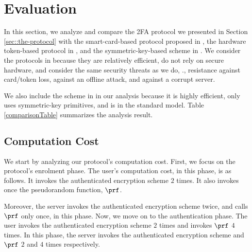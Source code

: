 
\section{Evaluation}\label{app:long-eval}



In this section, we analyze and compare the 2FA protocol we presented in Section \ref{sec::the-protocol} with the smart-card-based protocol proposed in  \cite{WangW18}, the hardware token-based protocol in \cite{JareckiJKSS21}, and the symmetric-key-based scheme in  \cite{MatsuoMY11}.  We consider the protocols in  \cite{WangW18,JareckiJKSS21} because they are relatively efficient, do not rely on secure hardware, and consider the same security threats as we do, \ie., resistance against card/token loss, against an offline attack, and against a corrupt server. 

We also include the scheme in  \cite{MatsuoMY11}  in our analysis because it is highly efficient, only uses symmetric-key primitives, and is in the standard model. Table \ref{comparisonTable} summarizes the analysis result.

%







\subsection{Computation Cost}

We start by analyzing our protocol's computation cost. First, we focus on the protocol's enrolment phase. The user's computation cost, in this phase, is as follows. It invokes the authenticated encryption scheme $2$ times. It also invokes once the pseudorandom function, $\prf$.
%

  Moreover, the server invokes the authenticated encryption scheme twice, and calls $\prf$ only once, in this phase. 
%  
%
Now, we move on to the authentication phase. The user invokes the authenticated encryption scheme $2$ times and invokes $\prf$ $4$ times. 
%
%
 In this phase, the server invokes the authenticated encryption scheme and $\prf$ $2$ and $4$ times respectively. %

